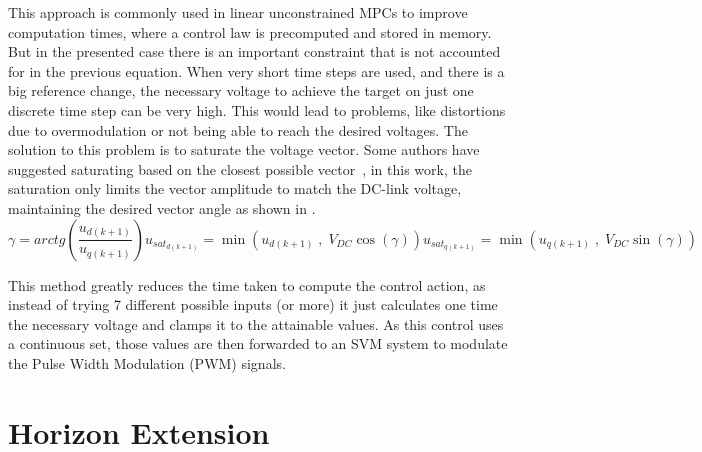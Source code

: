 \documentclass[9pt,conference]{IEEEtran}
\begin{document}
This approach is commonly used in linear unconstrained MPCs to improve computation times, where a control law is precomputed and stored in memory. But in the presented case there is an important constraint that is not accounted for in the previous equation. When very short time steps are used, and there is a big reference change, the necessary voltage to achieve the target on just one discrete time step can be very high. This would lead to problems, like distortions due to overmodulation or not being able to reach the desired voltages. The solution to this problem is to saturate the voltage vector. Some authors have suggested saturating based on the closest possible vector~\cite{Fernando:fast_predictive:2013}, in this work, the saturation only limits the vector amplitude to match the DC-link voltage, maintaining the desired vector angle as shown in .
\begin{subequations}
	\begin{equation}
			\gamma = arctg\left(\frac{u_{d(k+1)}}{u_{q(k+1)}}\right)
	\end{equation}
	\begin{equation}
		u_{sat_{d(k+1)}} = \min\left(u_{d(k+1)}\;,\; V_{DC}\cos(\gamma)\right)
	\end{equation}
	\begin{equation}
		u_{sat_{q(k+1)}} = \min\left(u_{q(k+1)}\;,\; V_{DC}\sin(\gamma)\right)
	\end{equation}
	\label{eq:Vdq_saturation}
\end{subequations}


This method greatly reduces the time taken to compute the control action, as instead of trying 7 different possible inputs (or more) it just calculates one time the necessary voltage and clamps it to the attainable values. As this control uses a continuous set, those values are then forwarded to an SVM system to modulate the Pulse Width Modulation (PWM) signals.

\section {Horizon Extension}
\end{document}
